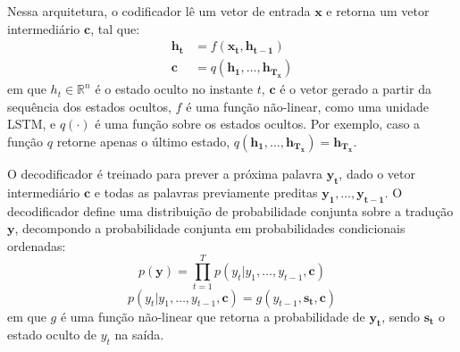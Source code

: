         
        
        
        


Nessa arquitetura, o codificador lê um vetor de entrada $\mathbf{x}$ e retorna
um vetor intermediário $\mathbf{c}$, tal que:   
\begin{align}
    \mathbf{h_t} &= f(\mathbf{x_t}, \mathbf{h_{t-1}}) \\
    \mathbf{c} &= q(\mathbf{h_1}, \ldots, \mathbf{h_{T_x}})
\end{align}
em que $h_t \in \mathbb{R}^n$ é o estado oculto no instante $t$, $\mathbf{c}$ é o vetor
gerado a partir da sequência dos estados ocultos, $f$ é uma função não-linear,
como uma unidade LSTM, e $q(\cdot)$ é uma função sobre os estados ocultos. Por
exemplo, caso a função $q$ retorne apenas o último estado, $q(\mathbf{h_1}, \ldots, \mathbf{h_{T_x}}) =
\mathbf{h_{T_x}}$.

O decodificador é treinado para prever a próxima palavra $\mathbf{y_t}$, dado o
vetor intermediário $\mathbf{c}$ e todas as palavras previamente preditas
$\mathbf{y_1}, \ldots, \mathbf{y_{t-1}}$. O decodificador define uma
distribuição de probabilidade conjunta sobre a tradução $\mathbf{y}$, decompondo
a probabilidade conjunta em probabilidades condicionais ordenadas:
\begin{equation}
    p(\mathbf{y}) = \prod_{t=1}^T p(y_t | y_1, \ldots, y_{t-1}, \mathbf{c})
\end{equation}
\begin{equation}
    p(y_t | y_1, \ldots, y_{t-1}, \mathbf{c}) = g(y_{t-1}, \mathbf{s_t}, \mathbf{c})
\end{equation}
em que $g$ é uma função não-linear que retorna a probabilidade de
$\mathbf{y_t}$, sendo $\mathbf{s_t}$ o estado oculto de $y_t$ na saída.

